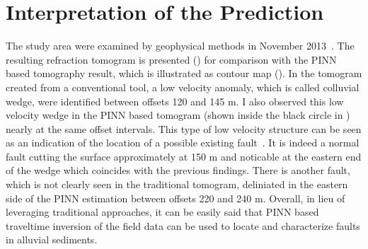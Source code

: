 \section{Interpretation of the Prediction} \label{sec:interpretation}

The study area were examined by geophysical methods in November 2013~\cite{hjk:14}. The resulting refraction tomogram is presented () for comparison with the PINN based tomography result, which is illustrated as contour map (). In the tomogram created from a conventional tool, a low velocity anomaly, which is called colluvial wedge, were identified  between offsets 120 and 145 m. I also observed this low velocity wedge in the PINN based tomogram (shown inside the black circle in ) nearly at the same offset intervals. This type of low velocity structure can be seen as an indication of the location of a possible existing fault~\cite{bscsbh:08,ms:99,nsbmm:11}. It is indeed a normal fault cutting the surface approximately at 150 m and noticable at the eastern end of the wedge which coincides with the previous findings. There is another fault, which is not clearly seen in the traditional tomogram, deliniated in the eastern side of the PINN estimation between offsets 220 and 240 m. Overall, in lieu of leveraging traditional approaches, it can be easily said that PINN based traveltime inversion of the field data can be used to locate and characterize faults in alluvial sediments.

